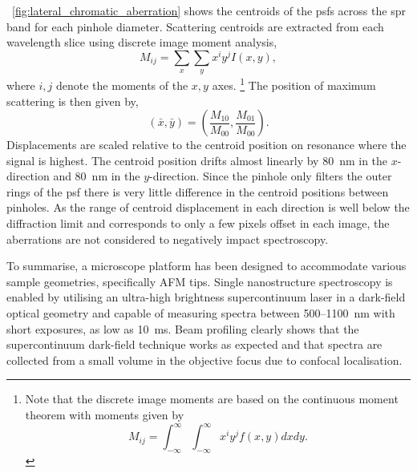 \documentclass{article}
\begin{document}
\figurename~\ref{fig:lateral_chromatic_aberration} shows the centroids of the \glspl{psf} across the \gls{spr} band for each pinhole diameter. Scattering centroids are extracted from each wavelength slice using discrete image moment analysis,
\begin{equation}
	M_{ij} = \sum_x \sum_y x^i y^j I(x,y),
	\label{eq:image_moments}
\end{equation}
where $i,j$ denote the moments of the $x,y$ axes.%
\footnote{Note that the discrete image moments are based on the continuous moment theorem with moments given by $$M_{ij} = \int_{-\infty}^{\infty} \int_{-\infty}^{\infty} x^i y^j f(x,y) dx dy.$$}
The position of maximum scattering is then given by,
\begin{equation}
	(\bar{x},\bar{y}) = \left( \frac{M_{10}}{M_{00}}, \frac{M_{01}}{M_{00}} \right).
	\label{eq:centroid_position}
\end{equation}
Displacements are scaled relative to the centroid position on resonance where the signal is highest. The centroid position drifts almost linearly by \SI{80}{nm} in the $x$-direction and \SI{80}{nm} in the $y$-direction. Since the pinhole only filters the outer rings of the \gls{psf} there is very little difference in the centroid positions between pinholes. As the range of centroid displacement in each direction is well below the diffraction limit and corresponds to only a few pixels offset in each image, the aberrations are not considered to negatively impact spectroscopy. %

To summarise, a microscope platform has been designed to accommodate various sample geometries, specifically AFM tips. Single nanostructure spectroscopy is enabled by utilising an ultra-high brightness supercontinuum laser in a dark-field optical geometry and capable of measuring spectra between 500--\SI{1100}{nm} with short exposures, as low as \SI{10}{ms}. Beam profiling clearly shows that the supercontinuum dark-field technique works as expected and that spectra are collected from a small volume in the objective focus due to confocal localisation.

\FloatBarrier
\end{document}

